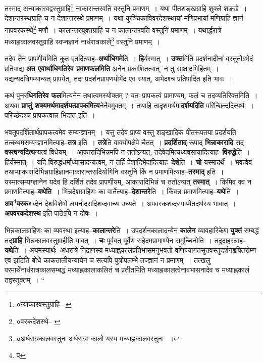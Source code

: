 \documentclass[article,12pt,a4paper]{memoir}
\begin{document}
	  \pstart तस्माद् अन्याकारवद्वस्तुग्राहि\footnote{०न्याकारवस्तुग्राहि--\cite{dp-msB} \cite{dp-msC} \cite{dp-msD}} नाकारान्तरवति वस्तुनि प्रमाणम् । यथा पीतशङ्खग्राहि शुक्ले शङ्खे । देशान्तरस्थग्राहि च न देशान्तरस्थे प्रमाणम् । यथा कुञ्चिकाविवरदेशस्थायां मणिप्रभायां मणिग्राहि ज्ञानं नापवरकस्थे\footnote{०वरकदेशस्थे--\cite{dp-msA} \cite{dp-msB} \cite{dp-msC} \cite{dp-msD} \cite{dp-edP} \cite{dp-edE} \cite{dp-edH} \cite{dp-edN}} मणौ । कालान्तरयुक्तग्राहि च न कालान्तरवति वस्तुनि प्रमाणम् । यथार्द्धरात्रे मध्याह्नकालवस्तुग्राहि स्वप्नज्ञानं नार्धरात्रकाले\footnote{०अर्धरात्रकालवस्तुनः \cite{dp-edN} अर्धरात्रः कालो यस्य मध्याह्नकालवस्तुनः \cite{dp-msD-n} ।} वस्तुनि प्रमाणम् ।
	\pend
      
	  \endgroup
	

	  \pstart तदेव तेन प्रापणीयमिति कुत एतदित्याह--\textbf{अर्थाधिगमे}ति । \textbf{हि}र्यस्मात् । \textbf{उक्त}मिति प्रदर्शनादीनां वस्तुतोऽभेदं प्रतिपाद्य \textbf{अत एवार्थाधिगतिरेव प्रमाणफलमिति} अनेन प्रकाशितत्वात्, न तु साक्षादभिहितम् । यद्यन्यदधिगम्यान्यत् प्रापयेत्, तदा प्रदर्शनप्रापणयोर्भेद एव स्यात्, अभेदश्च प्रतिपादित इति भावः ।
	\pend
      

	  \pstart कथं पुनर\textbf{धिगतिरेव फल}मित्यनेन तथात्वमस्योक्तम् ? यतः प्रापकत्वं प्रामाण्यम्, फलं च तदव्यतिरिक्तमिति । अथवा \textbf{प्राप्तुं शक्यमर्थमादर्शयत्प्रापकमित्य}नेनैवमुक्तम् । तथाहि तादृशमर्थमा\textbf{दर्शयदिति} परिच्छिन्ददित्यर्थः । परिच्छेदश्च प्रापकत्वान्न भिद्यत इति ।
	\pend
      

	  \pstart भवतूपदर्शितार्थप्रापकत्वमेव सम्यग्ज्ञानम् । यत्तु तदेव प्राप्य वस्तु शङ्खादिकं पीतरूपतया प्रदर्शयति तत्कथमसम्यग्ज्ञानमित्याह--\textbf{तत्र} इति । \textbf{तत्रे}ति वाक्योपक्षेपे चैतत् । \textbf{प्रदर्शिताद्} रूपाद् \textbf{भिन्नाकारादि} सद् \textbf{वस्त्वन्यदित्य}न्यत्वं विधेयम् । आकारादिभिन्नमपि न ततोऽन्यत्, तदेवेदमित्यध्यवसायादित्याह--\textbf{विरुद्धे}ति । हिर्यस्मात् । यदि विरुद्धधर्माध्यासादन्यत्वम्, न तर्हि देशादिभेदादित्याह--\textbf{देशे}ति । \textbf{चो} यस्मादर्थे । भवत्वेवं तथाप्याकारादिभिन्नग्राहिज्ञानमाकारान्तरादियोगिनि वस्तुनि किं न प्रमाणमित्याह--\textbf{तस्माद्} इति । यस्मात्सम्यग्ज्ञानेन यदेव हि दर्शितं तदेव प्रापणीयम्, आकारादिभिन्नं च ततोऽन्यत् \textbf{तस्मात्} । किमिव क्व न प्रमाणमित्याह--\textbf{यथेति} । भिन्नदेशग्राहिणः का वार्तेत्याह--\textbf{देशान्तरे}ति । किंवन्न प्रमाणमित्याह--\textbf{यथे}ति । \textbf{अव\footnote{प}\-वरक}शब्देन देशविशेषो लयनोदरादिशब्दवाच्य उच्यते । अपवरकशब्दस्याप्येतदर्थस्य भावात् । \textbf{अपवरकदेशस्थ} इति पाठेऽपि न दोषः ।
	\pend
      

	  \pstart भिन्नकालग्राहिणः का व्यवस्था इत्याह--\textbf{कालान्तरे}ति । उपदर्शनकालादन्येन \textbf{कालेन} व्यावहारिकेण \textbf{युक्तं} सम्बद्धं तद्\textbf{ग्राहि} भिन्नकालवस्तुग्राहीति यावत् । \textbf{चः} पूर्ववत् पूर्वेण सहेदमप्रामाण्येन समुच्चिनोति । तदुदाहरन्नाह--\textbf{यथे}ति । अयमस्यार्थः--अधरात्रे निद्राणस्य मध्याह्नकालप्रतिभासमनुभवतो वणिज्यागतसुतवस्तुदर्शनहृषितरोम्ण एव झटिति बोधे काकतालीयन्यायेन च सत्यपि पुत्रोपलम्भे तज्ज्ञानं न प्रमाणम् । तत्खलु परमार्थेनार्धरात्रकालसम्बद्धं मध्याह्नकालाकलितं च प्रतीतमिति मध्याह्नकालत्वेनावभासनादेव च मध्याह्नकालं तद्वस्तूक्तम् ।  \leavevmode{} “
	  
\end{document}
